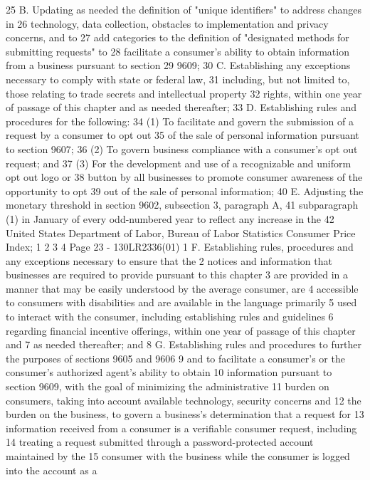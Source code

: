 25 B. Updating as needed the definition of "unique identifiers" to address changes in
26 technology, data collection, obstacles to implementation and privacy concerns, and to
27 add categories to the definition of "designated methods for submitting requests" to
28 facilitate a consumer's ability to obtain information from a business pursuant to section
29 9609;
30 C. Establishing any exceptions necessary to comply with state or federal law,
31 including, but not limited to, those relating to trade secrets and intellectual property
32 rights, within one year of passage of this chapter and as needed thereafter;
33 D. Establishing rules and procedures for the following:
34 (1) To facilitate and govern the submission of a request by a consumer to opt out
35 of the sale of personal information pursuant to section 9607;
36 (2) To govern business compliance with a consumer's opt out request; and
37 (3) For the development and use of a recognizable and uniform opt out logo or
38 button by all businesses to promote consumer awareness of the opportunity to opt
39 out of the sale of personal information;
40 E. Adjusting the monetary threshold in section 9602, subsection 3, paragraph A,
41 subparagraph (1) in January of every odd-numbered year to reflect any increase in the
42 United States Department of Labor, Bureau of Labor Statistics Consumer Price Index;
1
2
3
4
Page 23 - 130LR2336(01)
1 F. Establishing rules, procedures and any exceptions necessary to ensure that the
2 notices and information that businesses are required to provide pursuant to this chapter
3 are provided in a manner that may be easily understood by the average consumer, are
4 accessible to consumers with disabilities and are available in the language primarily
5 used to interact with the consumer, including establishing rules and guidelines
6 regarding financial incentive offerings, within one year of passage of this chapter and
7 as needed thereafter; and
8 G. Establishing rules and procedures to further the purposes of sections 9605 and 9606
9 and to facilitate a consumer's or the consumer's authorized agent's ability to obtain
10 information pursuant to section 9609, with the goal of minimizing the administrative
11 burden on consumers, taking into account available technology, security concerns and
12 the burden on the business, to govern a business's determination that a request for
13 information received from a consumer is a verifiable consumer request, including
14 treating a request submitted through a password-protected account maintained by the
15 consumer with the business while the consumer is logged into the account as a
